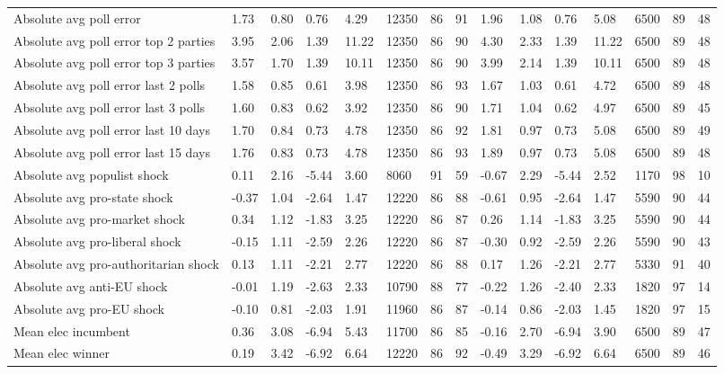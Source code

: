 \begin{longtable}{lllllllllllllll}
Absolute avg poll error & 1.73 & 0.80 & 0.76 & 4.29 & 12350 & 86 & 91 & 1.96 & 1.08 & 0.76 & 5.08 & 6500 & 89 & 48\\
Absolute avg poll error top 2 parties & 3.95 & 2.06 & 1.39 & 11.22 & 12350 & 86 & 90 & 4.30 & 2.33 & 1.39 & 11.22 & 6500 & 89 & 48\\
Absolute avg poll error top 3 parties & 3.57 & 1.70 & 1.39 & 10.11 & 12350 & 86 & 90 & 3.99 & 2.14 & 1.39 & 10.11 & 6500 & 89 & 48\\
Absolute avg poll error last 2 polls & 1.58 & 0.85 & 0.61 & 3.98 & 12350 & 86 & 93 & 1.67 & 1.03 & 0.61 & 4.72 & 6500 & 89 & 48\\
\addlinespace
Absolute avg poll error last 3 polls & 1.60 & 0.83 & 0.62 & 3.92 & 12350 & 86 & 90 & 1.71 & 1.04 & 0.62 & 4.97 & 6500 & 89 & 45\\
Absolute avg poll error last 10 days & 1.70 & 0.84 & 0.73 & 4.78 & 12350 & 86 & 92 & 1.81 & 0.97 & 0.73 & 5.08 & 6500 & 89 & 49\\
Absolute avg poll error last 15 days & 1.76 & 0.83 & 0.73 & 4.78 & 12350 & 86 & 93 & 1.89 & 0.97 & 0.73 & 5.08 & 6500 & 89 & 48\\
Absolute avg populist shock & 0.11 & 2.16 & -5.44 & 3.60 & 8060 & 91 & 59 & -0.67 & 2.29 & -5.44 & 2.52 & 1170 & 98 & 10\\
Absolute avg pro-state shock & -0.37 & 1.04 & -2.64 & 1.47 & 12220 & 86 & 88 & -0.61 & 0.95 & -2.64 & 1.47 & 5590 & 90 & 44\\
\addlinespace
Absolute avg pro-market shock & 0.34 & 1.12 & -1.83 & 3.25 & 12220 & 86 & 87 & 0.26 & 1.14 & -1.83 & 3.25 & 5590 & 90 & 44\\
Absolute avg pro-liberal shock & -0.15 & 1.11 & -2.59 & 2.26 & 12220 & 86 & 87 & -0.30 & 0.92 & -2.59 & 2.26 & 5590 & 90 & 43\\
Absolute avg pro-authoritarian shock & 0.13 & 1.11 & -2.21 & 2.77 & 12220 & 86 & 88 & 0.17 & 1.26 & -2.21 & 2.77 & 5330 & 91 & 40\\
Absolute avg anti-EU shock & -0.01 & 1.19 & -2.63 & 2.33 & 10790 & 88 & 77 & -0.22 & 1.26 & -2.40 & 2.33 & 1820 & 97 & 14\\
Absolute avg pro-EU shock & -0.10 & 0.81 & -2.03 & 1.91 & 11960 & 86 & 87 & -0.14 & 0.86 & -2.03 & 1.45 & 1820 & 97 & 15\\
\addlinespace
Mean elec incumbent & 0.36 & 3.08 & -6.94 & 5.43 & 11700 & 86 & 85 & -0.16 & 2.70 & -6.94 & 3.90 & 6500 & 89 & 47\\
Mean elec winner & 0.19 & 3.42 & -6.92 & 6.64 & 12220 & 86 & 92 & -0.49 & 3.29 & -6.92 & 6.64 & 6500 & 89 & 46\\

\end{longtable}
